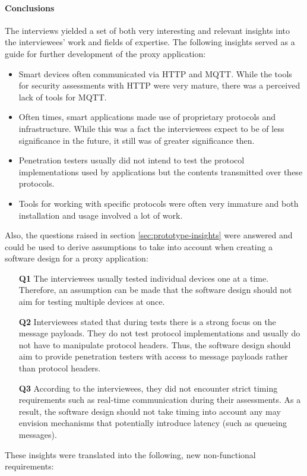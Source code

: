 \paragraph{Conclusions}
The interviews yielded a set of both very interesting and relevant insights into the interviewees' work and fields of expertise. The following insights served as a guide for further development of the proxy application:
\begin{itemize}
    \item Smart devices often communicated via \ac{HTTP} and \ac{MQTT}. While the tools for security assessments with \ac{HTTP} were very mature, there was a perceived lack of tools for \ac{MQTT}.
    \item Often times, smart applications made use of proprietary protocols and infrastructure. While this was a fact the interviewees expect to be of less significance in the future, it still was of greater significance then.
    \item Penetration testers usually did not intend to test the protocol implementations used by applications but the contents transmitted over these protocols.
    \item Tools for working with specific protocols were often very immature and both installation and usage involved a lot of work.
\end{itemize}
Also, the questions raised in section \ref{sec:prototype-insights} were answered and could be used to derive assumptions to take into account when creating a software design for a proxy application:
\begin{enumerate}
    \item [\textbf{Q1}] The interviewees usually tested individual devices one at a time.
          Therefore, an assumption can be made that the software design should not aim for testing multiple devices at once.
    \item [\textbf{Q2}] Interviewees stated that during tests there is a strong focus on the message payloads. They do not test protocol implementations and usually do not have to manipulate protocol headers. Thus, the software design should aim to provide penetration testers with access to message payloads rather than protocol headers.
    \item [\textbf{Q3}] According to the interviewees, they did not encounter strict timing requirements such as real-time communication during their assessments. As a result, the software design should not take timing into account any may envision mechanisms that potentially introduce latency (such as queueing messages).
\end{enumerate}
These insights were translated into the following, new non-functional requirements:


